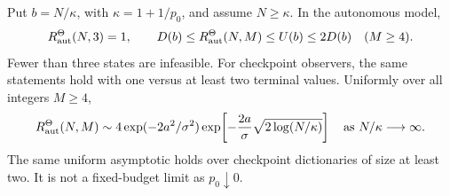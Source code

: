 \begin{theorem}\label{thm:gaussian}
Put $b=N/\kappa$, with $\kappa=1+1/p_0$, and assume $N\ge\kappa$. In the autonomous model,
\begin{equation}\label{eq:gaussian-width}
 R_{\mathrm{aut}}^\Theta(N,3)=1,
 \qquad
 D(b)\le R_{\mathrm{aut}}^\Theta(N,M)\le U(b)\le2D(b)\quad(M\ge4).
\end{equation}
Fewer than three states are infeasible. For checkpoint observers, the same statements hold with one versus at least two terminal values. Uniformly over all integers $M\ge4$,
\begin{equation}\label{eq:gaussian-asymp}
 R_{\mathrm{aut}}^\Theta(N,M)
 \sim 4\exp(-2a^2/\sigma^2)
       \exp\!\left[-\frac{2a}{\sigma}\sqrt{2\log(N/\kappa)}\right]
 \quad\text{as }N/\kappa\longrightarrow\infty.
\end{equation}
The same uniform asymptotic holds over checkpoint dictionaries of size at least two. It is not a fixed-budget limit as $p_0\downarrow0$.
\end{theorem}
